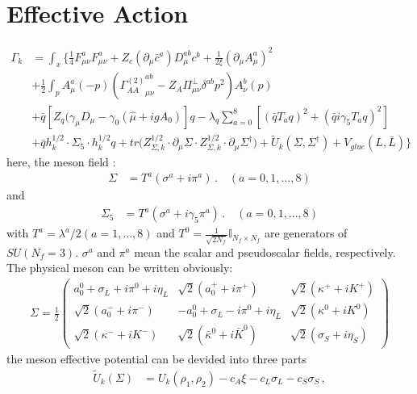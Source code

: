 \documentclass[12pt]{article}
\begin{document}
\section{Effective Action}
\begin{align}
\Gamma_k&=\int_x\bigg \{ \frac{1}{4} F_{\mu\nu}^a F_{\mu\nu}^a+Z_c (\partial_\mu \bar c^a) D_{\mu}^{a b} c^{b}+\frac{1}{2\xi}(\partial_\mu A_{\mu}^{a})^2\\ \nonumber
&+\frac{1}{2}\int_p A^a_{\mu}(-p) ({\Gamma_{AA}^{(2)}}_{\mu \nu}^{ab}-Z_A \Pi_{\mu \nu}^{\perp}\delta^{ab} p^2)A _{\nu}^b(p)\\  \nonumber
&+\bar q [Z_q (\gamma_\mu D_\mu-\gamma_0(\hat \mu+ig A_0)]q-\lambda_q \sum_{a=0}^8 [(\bar q T_a  q)^2+(\bar q i \gamma _5 T_a q)^2]\\  \nonumber
&+\bar q  h_{k}^{1/2}  \cdot \Sigma_{5} \cdot h_{k}^{1/2} q+tr \big (Z_{\Sigma,k}^{1/2} \cdot \partial_\mu\Sigma \cdot Z_{\Sigma,k}^{1/2}\cdot \partial_\mu\Sigma^\dagger\bigr) +\tilde U_k(\Sigma,\Sigma^\dagger)+V_{glue}(L,\bar L)
\bigg \}
\end{align}
here, the meson field :
\begin{align}
  \Sigma&=T^a(\sigma^a+i \pi^a)\,. \quad (a=0,1,...,8)\label{}
\end{align}
and 
\begin{align}
  \Sigma_5&=T^a(\sigma^a+i \gamma_5 \pi^a)\,. \quad (a=0,1,...,8)\label{}
\end{align}
with $T^a=\lambda^a/2(a=1,...,8)$ and $T^{0}=\frac{1}{\sqrt{2N_{f}}}\mathbb{I}_{N_{f}\times N_{f}}$ are generators of $SU(N_f=3)$. $\sigma^a$ and $\pi^a$ mean the scalar and pseudoscalar fields, respectively. The physical meson can be written obviously:
\begin{align}
\Sigma=\frac{1}{2}\begin{pmatrix}
a_0^0+\sigma_L+i\pi^0 + i\eta_L& \sqrt{2}(a_0^{+} +i \pi^{+}) & \sqrt{2} (\kappa^{+} +i K^{+})\\
\sqrt{2} (a_0^{-} +i \pi^{-}) & -a_0^0+\sigma_L - i\pi^0  + i\eta_L & \sqrt{2}(\kappa^0+i K^0) \\
\sqrt{2} (\kappa^{-} + i K^{-}) & \sqrt{2} (\bar \kappa^0 + i \bar K^0) & \sqrt{2} (\sigma_S + i \eta_S)\end{pmatrix}\label{eq:mesonmatrix}
\end{align}
the meson effective potential can be devided into three parts
\begin{align}
  \tilde{U}_{k}(\Sigma)&=U_k(\rho_1,\rho_2)-c_A \xi-c_L\sigma_L-c_S\sigma_S\,, \label{eq:tildeU}
\end{align}
\end{document}
